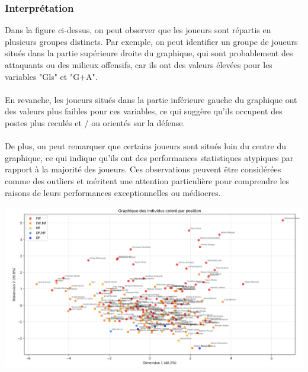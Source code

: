 \documentclass[12pt]{scrartcl}
\begin{document}
            \subsubsection{Interprétation}
                Dans la figure ci-dessus, on peut observer que les joueurs sont répartis en plusieurs groupes distincts. Par exemple, on peut identifier un groupe de joueurs situés dans la partie supérieure droite du graphique, qui sont probablement des attaquants ou des milieux offensifs, car ils ont des valeurs élevées pour les variables "Gls" et "G+A".\\\\
                En revanche, les joueurs situés dans la partie inférieure gauche du graphique ont des valeurs plus faibles pour ces variables, ce qui suggère qu'ils occupent des postes plus reculés et / ou orientés sur la défense.\\\\
                De plus, on peut remarquer que certains joueurs sont situés loin du centre du graphique, ce qui indique qu'ils ont des performances statistiques atypiques par rapport à la majorité des joueurs. Ces observations peuvent être considérées comme des outliers et méritent une attention particulière pour comprendre les raisons de leurs performances exceptionnelles ou médiocres.\\

                \begin{center}
                    \includegraphics[width=1\textwidth]{images/graphique_des_individus_positions.png}
                \end{center}
\end{document}
